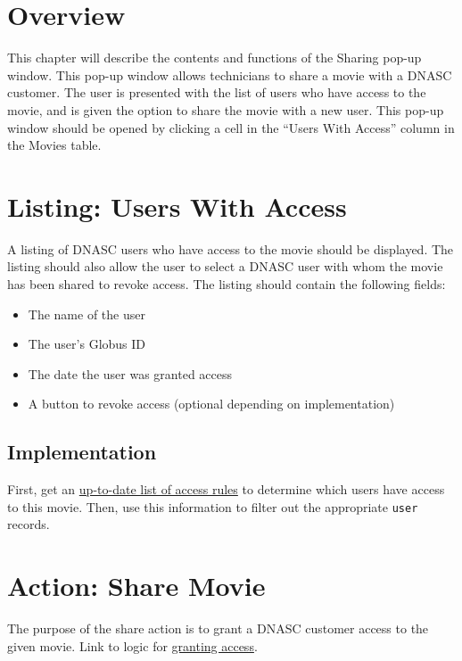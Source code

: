 
\section{Overview}

This chapter will describe the contents and functions of the Sharing pop-up window. This 
pop-up window allows technicians to share a movie with a DNASC customer. The user is presented
with the list of users who have access to the movie, and is given the option to share the movie
with a new user. This pop-up window should be opened by clicking a cell in the 
``Users With Access'' column in the Movies table.

\section{Listing: Users With Access}

A listing of DNASC users who have access to the movie should be displayed. The listing should
also allow the user to select a DNASC user with whom the movie has been shared to revoke access.
The listing should contain the following fields:

\begin{itemize}\itemsep1pt
    \item The name of the user
    \item The user's Globus ID
    \item The date the user was granted access
    \item A button to revoke access (optional depending on implementation)
\end{itemize}

\subsection{Implementation}

First, get an \hyperref[section:updatingcollectionaccessrules]{up-to-date list of access rules} 
to determine which users have access to this movie. Then, use this information to filter out the 
appropriate \texttt{user} records.

\section{Action: Share Movie}

The purpose of the share action is to grant a DNASC customer access to the given movie.
Link to logic for \hyperref[appendix:grantingaccess]{granting access}.


